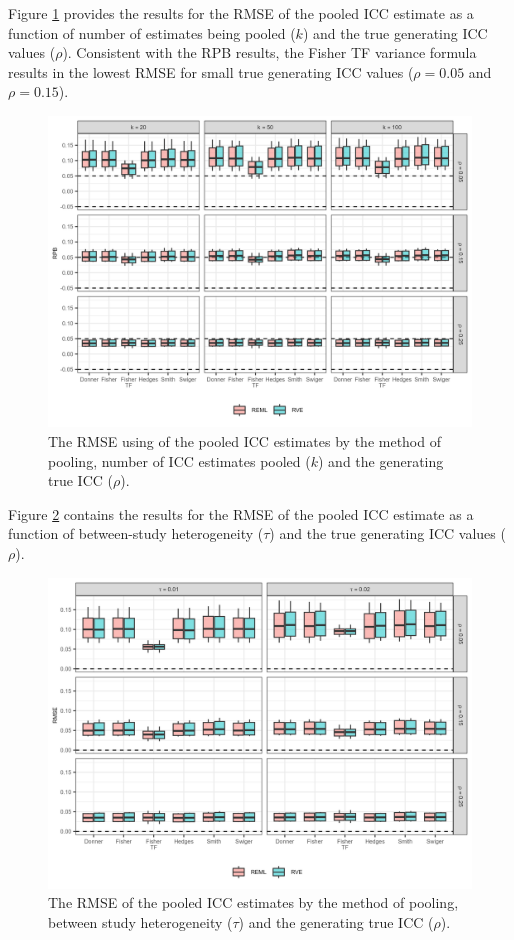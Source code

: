 Figure \ref{fig:RMSEk} provides the results for the RMSE of the pooled ICC estimate as a function of number of estimates being pooled ($k$) and the true generating ICC values ($\rho$). Consistent with the RPB results, the Fisher TF variance formula results in the lowest RMSE for small true generating ICC values ($\rho=0.05$ and $\rho=0.15$).
\begin{figure}[h!]
\centerline{\includegraphics{Main/RMSE_numICC.png}}
    \caption{The RMSE using of the pooled ICC estimates by the method of pooling, number of ICC estimates pooled ($k$) and the generating true ICC ($\rho$).\label{fig:RMSEk} }
\end{figure}


Figure \ref{fig:RMSEtau} contains the results for the RMSE of the pooled ICC estimate as a function of between-study heterogeneity ($\tau$) and the true generating ICC values ($\rho$). 

\begin{figure}[h!]
\centerline{\includegraphics{Main/RMSE_tau.png}}
    \caption{The RMSE of the pooled ICC estimates by the method of pooling, between study heterogeneity ($\tau$) and the generating true ICC ($\rho$). \label{fig:RMSEtau} }
\end{figure}


